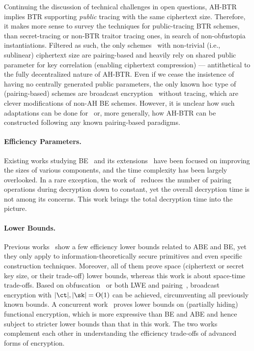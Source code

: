 Continuing the discussion of technical challenges in open questions,
AH-BTR implies BTR supporting \emph{public} tracing
with the same ciphertext size.
Therefore, it makes more sense to survey
the techniques for public-tracing BTR schemes,
than secret-tracing or non-BTR traitor tracing ones,
in search of non-obfustopia instantiations.
Filtered as such,
the only schemes~\cite{CCS:BonWat06,CCS:GKSW10}
with non-trivial (i.e., sublinear) ciphertext size
are pairing-based and
heavily rely on shared public parameter for key correlation
(enabling ciphertext compression)
---
antithetical to the fully decentralized nature of AH-BTR.
Even if we cease
the insistence of having no centrally generated public parameters,
the only known \ad hoc type of (pairing-based) schemes are
broadcast encryption~\cite{CCS:WQZD10,AC:KolMalWee23} without tracing,
which are clever modifications of non-AH BE schemes.
However, it is unclear
how such adaptations can be done for~\cite{CCS:BonWat06,CCS:GKSW10}
or, more generally,
how AH-BTR can be constructed following any known pairing-based paradigms.

\paragraph{Efficiency Parameters.}
Existing works studying
BE~\cite{C:FiaNao93,C:BonGenWat05,EC:GenWat09,C:BonWatZha14,EC:AgrYam20,TCC:AgrWicYam20,EPRINT:BraVai20,C:Zhandry20,EC:Wee22}
and
its extensions~\cite{PAIRING:DelPaiPoi07,AC:Delerablee07,EPRINT:SakFur07,C:BonZha14}
have been focused on improving the sizes of various components,
and the time complexity has been largely overlooked.
In a rare exception,
the work of~\cite{PKC:AttLib10}
reduces the number of pairing operations during decryption down to constant,
yet the overall decryption time is not among its concerns.
This work brings the total decryption time into the picture.

\paragraph{Lower Bounds.}
Previous works~\cite{EC:BluCre94,EC:LubSta98,AC:KYDB98,AFRICACRYPT:AusKre08,AC:KatYer09,C:GayKerWee15,ITC:DLY21} show a few efficiency lower bounds related to ABE and BE,
yet they only apply to information-theoretically secure primitives and even specific construction techniques.
Moreover, all of them prove space (ciphertext or secret key size, or their trade-off) lower bounds, whereas
this work is about space-time trade-offs.
Based on obfuscation~\cite{C:BonWatZha14} or both LWE and pairing~\cite{EC:AgrYam20}, broadcast encryption with ${|\ct|,|\sk|=\bigO(1)}$ can be achieved,
circumventing all previously known bounds.
A concurrent work~\cite{EC:JaiLinLuo23}
proves lower bounds
on (partially hiding) functional encryption,
which is more expressive than BE and ABE and
hence subject to stricter lower bounds than that in this work.
The two works complement each other
in understanding the efficiency trade-offs of advanced forms of encryption.
